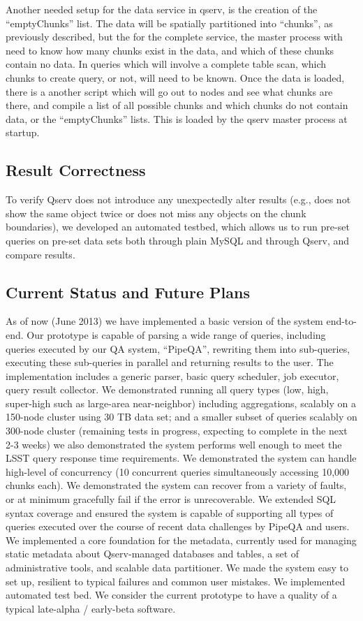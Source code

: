 \documentclass[DM,lsstdraft,toc]{lsstdoc}
\begin{document}
Another needed setup for the data service in qserv, is the creation of
the ``emptyChunks'' list. The data will be spatially partitioned into
``chunks'', as previously described, but the for the complete service,
the master process with need to know how many chunks exist in the data,
and which of these chunks contain no data. In queries which will involve
a complete table scan, which chunks to create query, or not, will need
to be known. Once the data is loaded, there is a another script which
will go out to nodes and see what chunks are there, and compile a list
of all possible chunks and which chunks do not contain data, or the
``emptyChunks'' lists. This is loaded by the qserv master process at
startup.

\subsection{Result Correctness}\label{result-correctness}

To verify Qserv does not introduce any unexpectedly alter results (e.g.,
does not show the same object twice or does not miss any objects on the
chunk boundaries), we developed an automated testbed, which allows us to
run pre-set queries on pre-set data sets both through plain MySQL and
through Qserv, and compare results.

\subsection{Current Status and Future
Plans}\label{current-status-and-future-plans}

As of now (June 2013) we have implemented a basic version of the system
end-to-end. Our prototype is capable of parsing a wide range of queries,
including queries executed by our QA system, ``PipeQA'', rewriting them
into sub-queries, executing these sub-queries in parallel and returning
results to the user. The implementation includes a generic parser, basic
query scheduler, job executor, query result collector. We demonstrated
running all query types (low, high, super-high such as large-area
near-neighbor) including aggregations, scalably on a 150-node cluster
using 30 TB data set; and a smaller subset of queries scalably on
300-node cluster (remaining tests in progress, expecting to complete in
the next 2-3 weeks) we also demonstrated the system performs well enough
to meet the LSST query response time requirements. We demonstrated the
system can handle high-level of concurrency (10 concurrent queries
simultaneously accessing 10,000 chunks each). We demonstrated the system
can recover from a variety of faults, or at minimum gracefully fail if
the error is unrecoverable. We extended SQL syntax coverage and ensured
the system is capable of supporting all types of queries executed over
the course of recent data challenges by PipeQA and users. We implemented
a core foundation for the metadata, currently used for managing static
metadata about Qserv-managed databases and tables, a set of
administrative tools, and scalable data partitioner. We made the system
easy to set up, resilient to typical failures and common user mistakes.
We implemented automated test bed. We consider the current prototype to
have a quality of a typical late-alpha / early-beta software.
\end{document}
